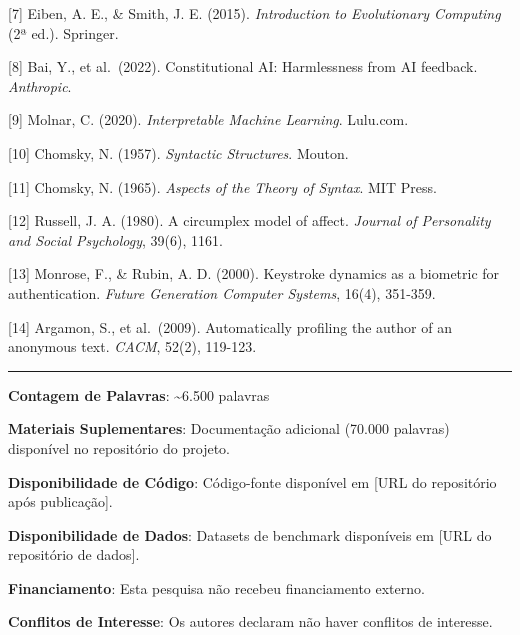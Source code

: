 \documentclass[
]{article}
\begin{document}
{[}7{]} Eiben, A. E., \& Smith, J. E. (2015). \emph{Introduction to
Evolutionary Computing} (2ª ed.). Springer.

{[}8{]} Bai, Y., et al.~(2022). Constitutional AI: Harmlessness from AI
feedback. \emph{Anthropic}.

{[}9{]} Molnar, C. (2020). \emph{Interpretable Machine Learning}.
Lulu.com.

{[}10{]} Chomsky, N. (1957). \emph{Syntactic Structures}. Mouton.

{[}11{]} Chomsky, N. (1965). \emph{Aspects of the Theory of Syntax}. MIT
Press.

{[}12{]} Russell, J. A. (1980). A circumplex model of affect.
\emph{Journal of Personality and Social Psychology}, 39(6), 1161.

{[}13{]} Monrose, F., \& Rubin, A. D. (2000). Keystroke dynamics as a
biometric for authentication. \emph{Future Generation Computer Systems},
16(4), 351-359.

{[}14{]} Argamon, S., et al.~(2009). Automatically profiling the author
of an anonymous text. \emph{CACM}, 52(2), 119-123.

\begin{center}\rule{0.5\linewidth}{0.5pt}\end{center}

\textbf{Contagem de Palavras}: \textasciitilde6.500 palavras

\textbf{Materiais Suplementares}: Documentação adicional (70.000
palavras) disponível no repositório do projeto.

\textbf{Disponibilidade de Código}: Código-fonte disponível em {[}URL do
repositório após publicação{]}.

\textbf{Disponibilidade de Dados}: Datasets de benchmark disponíveis em
{[}URL do repositório de dados{]}.

\textbf{Financiamento}: Esta pesquisa não recebeu financiamento externo.

\textbf{Conflitos de Interesse}: Os autores declaram não haver conflitos
de interesse.
\end{document}

